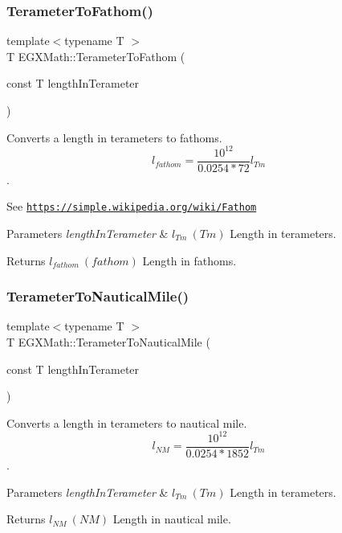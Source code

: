 \subsubsection{\texorpdfstring{Terameter\+To\+Fathom()}{TerameterToFathom()}}
{\footnotesize\ttfamily template$<$typename T $>$ \\
T E\+G\+X\+Math\+::\+Terameter\+To\+Fathom (\begin{DoxyParamCaption}\item[{const T}]{length\+In\+Terameter }\end{DoxyParamCaption})}



Converts a length in terameters to fathoms. \[ l_{fathom}= \frac{10^{12}}{0.0254 * 72} l_{Tm} \]. 

See \href{https://simple.wikipedia.org/wiki/Fathom}{\tt https\+://simple.\+wikipedia.\+org/wiki/\+Fathom} 
\begin{DoxyParams}{Parameters}
{\em length\+In\+Terameter} & $ l_{Tm}\ (Tm)$ Length in terameters. \\
\hline
\end{DoxyParams}
\begin{DoxyReturn}{Returns}
$ l_{fathom}\ (fathom)$ Length in fathoms. 
\end{DoxyReturn}
\mbox{\label{group___e_g_x_math-_conversions-_length_conversions-_s_i-_terameter-_nautical_ga6a799ea329334a189c2ed5a898a238af}} 
\subsubsection{\texorpdfstring{Terameter\+To\+Nautical\+Mile()}{TerameterToNauticalMile()}}
{\footnotesize\ttfamily template$<$typename T $>$ \\
T E\+G\+X\+Math\+::\+Terameter\+To\+Nautical\+Mile (\begin{DoxyParamCaption}\item[{const T}]{length\+In\+Terameter }\end{DoxyParamCaption})}



Converts a length in terameters to nautical mile. \[ l_{NM}= \frac{10^{12}}{0.0254 * 1852} l_{Tm} \]. 


\begin{DoxyParams}{Parameters}
{\em length\+In\+Terameter} & $ l_{Tm}\ (Tm)$ Length in terameters. \\
\hline
\end{DoxyParams}
\begin{DoxyReturn}{Returns}
$ l_{NM}\ (NM)$ Length in nautical mile. 
\end{DoxyReturn}
